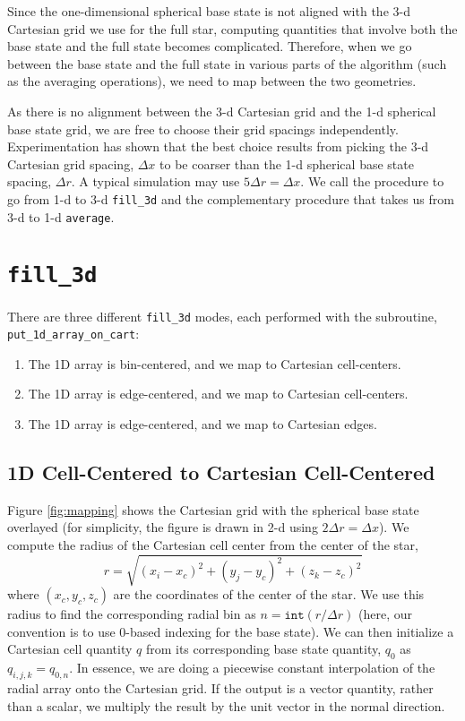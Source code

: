 Since the one-dimensional spherical base state is not aligned with the
3-d Cartesian grid we use for the full star, computing quantities that
involve both the base state and the full state becomes complicated.
Therefore, when we go between the base state and the full state in
various parts of the algorithm (such as the averaging operations), we
need to map between the two geometries.

As there is no alignment between the 3-d Cartesian grid and the 1-d
spherical base state grid, we are free to choose their grid spacings
independently.  Experimentation has shown that the best choice results
from picking the 3-d Cartesian grid spacing, $\Delta x$ to be coarser
than the 1-d spherical base state spacing, $\Delta r$.
A typical simulation may use $5 \Delta r = \Delta x$.
We call the procedure to go from 1-d to 3-d {\tt fill\_3d} and the
complementary procedure that takes us from 3-d to 1-d {\tt average}.
\section{\tt fill\_3d}
There are three different {\tt fill\_3d} modes, each performed with the
subroutine, {\tt put\_1d\_array\_on\_cart}:
\begin{enumerate}
\item The 1D array is bin-centered, and we map to Cartesian cell-centers.
\item The 1D array is edge-centered, and we map to Cartesian cell-centers.
\item The 1D array is edge-centered, and we map to Cartesian edges.  
\end{enumerate}
\subsection{1D Cell-Centered to Cartesian Cell-Centered}
\label{Sec:1D Cell-Centered to Cartesian Cell-Centered}
Figure \ref{fig:mapping} shows the Cartesian grid with the spherical
base state overlayed (for simplicity, the figure is drawn in 2-d 
using $2 \Delta r = \Delta x$).  
We compute the radius of the Cartesian cell center from the center of the star,
\begin{equation}
r = \sqrt{(x_i - x_c)^2 + (y_j - y_c)^2 + (z_k - z_c)^2}
\end{equation}
where $(x_c, y_c, z_c)$ are the coordinates of the center of the star.
We use this radius to find the corresponding radial bin as $n = \mathtt{int}(r
/ \Delta r)$ (here, our convention is to use 0-based indexing for the
base state).  We can then initialize a Cartesian cell quantity $q$ from its
corresponding base state quantity, $q_0$ as $q_{i,j,k} = q_{0,n}$.  In essence,
we are doing a piecewise constant interpolation of the radial array onto the 
Cartesian grid.  If the output is a vector quantity, rather than a scalar, we
multiply the result by the unit vector in the normal direction.
